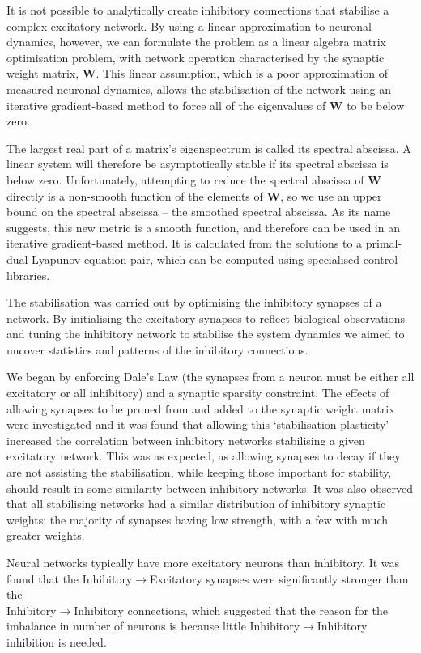 \documentclass[12pt, a4paper]{article}
\begin{document}
It is not possible to analytically create inhibitory connections that stabilise a complex excitatory network.  By using a linear approximation to neuronal dynamics, however, we can formulate the problem as a linear algebra matrix optimisation problem, with network operation characterised by the synaptic weight matrix, $\mathbf{W}$.  This linear assumption, which is a poor approximation of measured neuronal dynamics, allows the stabilisation of the network using an iterative gradient-based method to force all of the eigenvalues of $\mathbf{W}$ to be below zero.  

The largest real part of a matrix's eigenspectrum is called its spectral abscissa.  A linear system will therefore be asymptotically stable if its spectral abscissa is below zero.  Unfortunately, attempting to reduce the spectral abscissa of $\mathbf{W}$ directly is a non-smooth function of the elements of $\mathbf{W}$, so we use an upper bound on the spectral abscissa -- the smoothed spectral abscissa.  As its name suggests, this new metric is a smooth function, and therefore can be used in an iterative gradient-based method.  It is calculated from the solutions to a primal-dual Lyapunov equation pair, which can be computed using specialised control libraries.

The stabilisation was carried out by optimising the inhibitory synapses of a network.  By initialising the excitatory synapses to reflect biological observations and tuning the inhibitory network to stabilise the system dynamics we aimed to uncover statistics and patterns of the inhibitory connections. 

We began by enforcing Dale's Law (the synapses from a neuron must be either all excitatory or all inhibitory) and a synaptic sparsity constraint.  The effects of allowing synapses to be pruned from and added to the synaptic weight matrix were investigated and it was found that allowing this `stabilisation plasticity' increased the correlation between inhibitory networks stabilising a given excitatory network.  This was as expected, as allowing synapses to decay if they are not assisting the stabilisation, while keeping those important for stability, should result in some similarity between inhibitory networks.  It was also observed that all stabilising networks had a similar distribution of inhibitory synaptic weights; the majority of synapses having low strength, with a few with much greater weights.

Neural networks typically have more excitatory neurons than inhibitory.  It was found that the Inhibitory$\rightarrow$Excitatory synapses were significantly stronger than the \\Inhibitory$\rightarrow$Inhibitory connections, which suggested that the reason for the imbalance in number of neurons is because little Inhibitory$\rightarrow$Inhibitory inhibition is needed.
\end{document}

